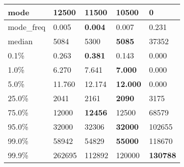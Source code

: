 \begin{table}[H]
\begin{tabular}{|l|m{10em}|m{10em}|m{10em}|m{10em}|}
\hline mode & 12500 & \bfseries 11500 & 10500 & \cellcolor[rgb]{0.9, 0.54, 0.52} 0 \\
\hline mode\_freq & 0.005 & \bfseries 0.004 & 0.007 & \cellcolor[rgb]{0.9, 0.54, 0.52} 0.231 \\
\hline median & 5084 & 5300 & \bfseries 5085 & \cellcolor[rgb]{0.9, 0.54, 0.52} 37352 \\
\hline 0.1\% & 0.263 & \bfseries 0.381 & 0.143 & \cellcolor[rgb]{0.9, 0.54, 0.52} 0.000 \\
\hline 1.0\% & 6.270 & 7.641 & \bfseries 7.000 & \cellcolor[rgb]{0.9, 0.54, 0.52} 0.000 \\
\hline 5.0\% & 11.760 & 12.174 & \bfseries 12.000 & \cellcolor[rgb]{0.9, 0.54, 0.52} 0.000 \\
\hline 25.0\% & 2041 & 2161 & \bfseries 2090 & \cellcolor[rgb]{0.9, 0.54, 0.52} 3175 \\
\hline 75.0\% & 12000 & \bfseries 12456 & 12500 & \cellcolor[rgb]{0.9, 0.54, 0.52} 68579 \\
\hline 95.0\% & 32000 & 32306 & \bfseries 32000 & \cellcolor[rgb]{0.9, 0.54, 0.52} 102655 \\
\hline 99.0\% & 58942 & 54829 & \bfseries 55000 & \cellcolor[rgb]{0.9, 0.54, 0.52} 118670 \\
\hline 99.9\% & 262695 & \cellcolor[rgb]{0.9, 0.54, 0.52} 112892 & 120000 & \bfseries 130788 \\
\hline
\end{tabular}
\end{table}
